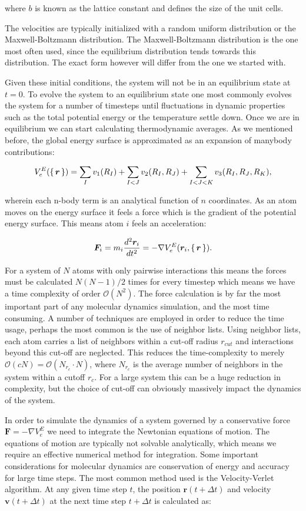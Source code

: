 where $b$ is known as the lattice constant and defines
the size of the unit cells.
\par
The velocities are typically initialized with a random uniform
distribution or the Maxwell-Boltzmann distribution.
The Maxwell-Boltzmann distribution is the one most often used,
since the equilibrium distribution tends towards this distribution.
The exact form however will differ from the one we started with.
\par
Given these initial conditions, the system will not be in an
equilibrium state at $t=0$. To evolve the system
to an equilibrium state one most commonly evolves the system
for a number of timesteps until fluctuations in dynamic
properties such as the total potential energy or the temperature
settle down. Once we are in equilibrium we can start calculating
thermodynamic averages.
\newline
\newline
As we mentioned before, the global energy surface
is approximated as an expansion of manybody contributions:

$$ V_e^E(\set{\bm{r}}) =
    \sum_I v_1(R_I) + \sum_{I < J} v_2(R_I, R_J)
    + \sum_{I < J < K} v_3(R_I, R_J, R_K) , $$

wherein each n-body term is an analytical function
of $n$ coordinates.
As an atom moves on the energy surface
it feels a force which is the gradient of the potential energy surface.
This means atom $i$ feels an acceleration:

$$ \bm{F}_i = m_i \frac{d^2 \bm{r}_i}{dt^2} =
    -\nabla V_e^E(\bm{r}_i, \set{\bm{r}}) . $$

For a system of $N$ atoms with only pairwise interactions
this means the forces must be calculated $N(N-1)/2$ times
for every timestep which means we have a time complexity
of order $\mathcal{O}(N^2)$. The force calculation is by far
the most important part of any molecular dynamics simulation,
and the most time consuming.
A number of techniques are employed in order to reduce
the time usage, perhaps the most common is the use of neighbor
lists. Using neighbor lists, each atom carries a list of neighbors
within a cut-off radius $r_{cut}$ and interactions
beyond this cut-off are neglected.
This reduces the time-complexity to merely
$\mathcal{O}(cN) = \mathcal{O}(N_{r_c} \cdot N)$,
where $N_{r_c}$ is the average number of neighbors in the system
within a cutoff $r_c$. For a large system this can be a
huge reduction in complexity, but the choice of cut-off
can obviously massively impact the dynamics of the system.
\par
In order to simulate the dynamics of a system governed by
a conservative force $\bm{F} = - \nabla V_e^E$
we need to integrate the Newtonian equations of motion.
The equations of motion are typically not solvable
analytically, which means we require an effective numerical
method for integration. Some important considerations
for molecular dynamics are conservation of energy
and accuracy for large time steps.
The most common method used is the Velocity-Verlet algorithm.
At any given time step $t$, the position $\bm{r}(t + \Delta t)$
and velocity $\bm{v}(t + \Delta t)$ at the next time step
$t + \Delta t$ is calculated as:

